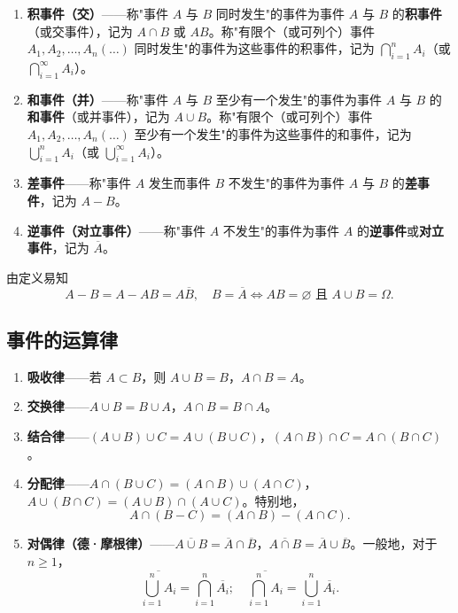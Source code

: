 \documentclass[lang=cn,11pt]{elegantbook}
\begin{document}
\begin{enumerate}
    \item \textbf{积事件（交）}——称"事件 \(A\) 与 \(B\) 同时发生"的事件为事件 \(A\) 与 \(B\) 的\textbf{积事件}（或交事件），记为 \(A \cap B\) 或 \(AB\)。称"有限个（或可列个）事件 \(A_1, A_2, \dots, A_n(\dots)\) 同时发生"的事件为这些事件的积事件，记为 \(\bigcap_{i=1}^{n} A_i\)（或 \(\bigcap_{i=1}^{\infty} A_i\)）。
    \item \textbf{和事件（并）}——称"事件 \(A\) 与 \(B\) 至少有一个发生"的事件为事件 \(A\) 与 \(B\) 的\textbf{和事件}（或并事件），记为 \(A \cup B\)。称"有限个（或可列个）事件 \(A_1, A_2, \dots, A_n(\dots)\) 至少有一个发生"的事件为这些事件的和事件，记为 \(\bigcup_{i=1}^{n} A_i\)（或 \(\bigcup_{i=1}^{\infty} A_i\)）。
    \item \textbf{差事件}——称"事件 \(A\) 发生而事件 \(B\) 不发生"的事件为事件 \(A\) 与 \(B\) 的\textbf{差事件}，记为 \(A - B\)。
    \item \textbf{逆事件（对立事件）}——称"事件 \(A\) 不发生"的事件为事件 \(A\) 的\textbf{逆事件}或\textbf{对立事件}，记为 \(\overline{A}\)。
\end{enumerate}

由定义易知
\[
A - B = A - AB = A\overline{B}, \quad B = \overline{A} \Leftrightarrow AB = \varnothing \text{ 且 } A \cup B = \Omega.
\]

\subsection{事件的运算律}

\begin{enumerate}
    \item \textbf{吸收律}——若 \(A \subset B\)，则 \(A \cup B = B\)，\(A \cap B = A\)。
    \item \textbf{交换律}——\(A \cup B = B \cup A\)，\(A \cap B = B \cap A\)。
    \item \textbf{结合律}——\((A \cup B) \cup C = A \cup (B \cup C)\)，\((A \cap B) \cap C = A \cap (B \cap C)\)。
    \item \textbf{分配律}——\(A \cap (B \cup C) = (A \cap B) \cup (A \cap C)\)，\(A \cup (B \cap C) = (A \cup B) \cap (A \cup C)\)。特别地，
    \[
    A \cap (B - C) = (A \cap B) - (A \cap C).
    \]
    \item \textbf{对偶律（德·摩根律）}——\(\overline{A \cup B} = \overline{A} \cap \overline{B}\)，\(\overline{A \cap B} = \overline{A} \cup \overline{B}\)。一般地，对于 \(n \ge 1\)，
    \[
    \overline{\bigcup_{i=1}^{n} A_i} = \bigcap_{i=1}^{n} \overline{A_i}; \quad \overline{\bigcap_{i=1}^{n} A_i} = \bigcup_{i=1}^{n} \overline{A_i}.
    \]
\end{enumerate}
\end{document}
